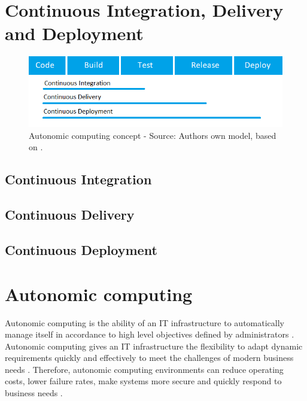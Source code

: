 \section{Continuous Integration, Delivery and Deployment}

\begin{figure}[h]
\centering
\includegraphics[scale=1]{images/02_theoretical_foundation/ci_cd/ci_cd_phases}
\caption{Autonomic computing concept - Source: Authors own model, based on \cite{Jacob2004AutonomicSolution}.}
\label{fig:02_foundation_ci-cd_phases}
\end{figure}

\subsection{Continuous Integration}


\subsection{Continuous Delivery}


\subsection{Continuous Deployment}


\section{Autonomic computing}
\label{sec:02_ac}
Autonomic computing is the ability of an IT infrastructure to automatically manage itself in accordance to high level objectives defined by administrators \cite{Kephart2003VisionComputing}.
Autonomic computing gives an IT infrastructure the flexibility to adapt dynamic requirements quickly and effectively to meet the challenges of modern business needs \cite{Murch2004Autonomic}. Therefore, autonomic computing environments can reduce operating costs, lower failure rates, make systems more secure and quickly respond to business needs \cite{Jacob2004AutonomicSolution}.


